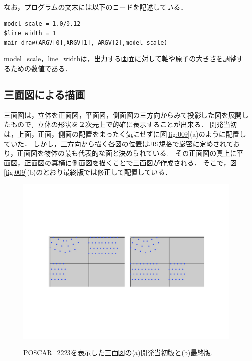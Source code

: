 なお，プログラムの文末には以下のコードを記述している．
\begin{lstlisting}[style=customRuby,basicstyle={\scriptsize\ttfamily}]
model_scale = 1.0/0.12
$line_width = 1
main_draw(ARGV[0],ARGV[1], ARGV[2],model_scale)
\end{lstlisting}
model\_scale，line\_widthは，出力する画面に対して軸や原子の大きさを調整するための数値である．

\subsection{三面図による描画}
三面図は，立体を正面図，平面図，側面図の三方向からみて投影した図を展開したもので，立体の形状を２次元上で的確に表示することが出来る．
開発当初は，上面，正面，側面の配置をまったく気にせずに図\ref{fig:009}(a)のように配置していた．
しかし，三方向から描く各図の位置はJIS規格で厳密に定めされており，正面図を物体の最も代表的な面と決められている\cite{ThreeViewDrawing}．
その正面図の真上に平面図，正面図の真横に側面図を描くことで三面図が作成される．
そこで，図\ref{fig:009}(b)のとおり最終版では修正して配置している．

\begin{figure}[htbp]\begin{center}
\includegraphics[width=12cm,bb= 0 0 937 753]{../figs/./boundary_narita.009.jpeg}
\caption{POSCAR\_2223を表示した三面図の(a)開発当初版と(b)最終版.}
\label{fig:009}
\label{default}\end{center}\end{figure}
